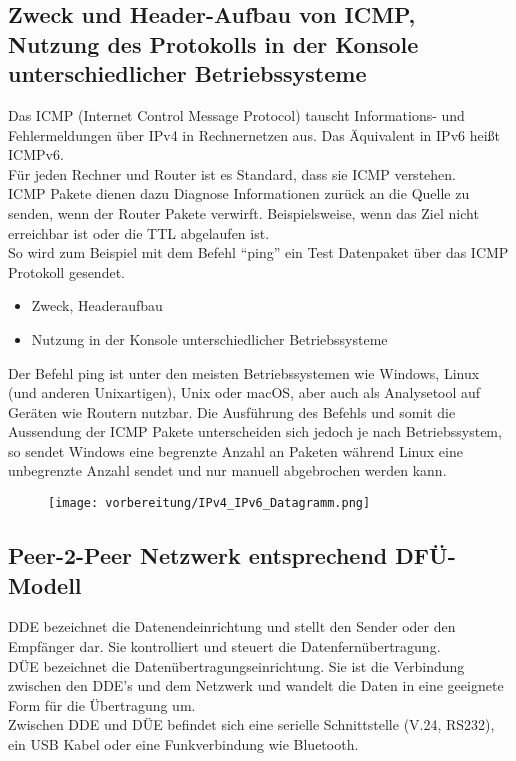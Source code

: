\subsection{Zweck und Header-Aufbau von ICMP, Nutzung des Protokolls in der Konsole unterschiedlicher Betriebssysteme}
    Das ICMP (Internet Control Message Protocol) tauscht Informations- und Fehlermeldungen über IPv4 in Rechnernetzen aus. Das Äquivalent in IPv6 heißt ICMPv6.\\
    Für jeden Rechner und Router ist es Standard, dass sie ICMP verstehen.\\
    ICMP Pakete dienen dazu Diagnose Informationen zurück an die Quelle zu senden, wenn der Router Pakete verwirft. Beispielsweise, wenn das Ziel nicht erreichbar ist oder die TTL abgelaufen ist.\\
    So wird zum Beispiel mit dem Befehl “ping” ein Test Datenpaket über das ICMP Protokoll gesendet.\\
    \begin{itemize}
        \item Zweck, Headeraufbau
        \item Nutzung in der Konsole unterschiedlicher Betriebssysteme
    \end{itemize}

    Der Befehl ping ist unter den meisten Betriebssystemen wie Windows, Linux (und anderen Unixartigen), Unix oder macOS, aber auch als Analysetool auf Geräten wie Routern nutzbar. Die Ausführung des Befehls und somit die Aussendung der ICMP Pakete unterscheiden sich jedoch je nach Betriebssystem, so sendet Windows eine begrenzte Anzahl an Paketen während Linux eine unbegrenzte Anzahl sendet und nur manuell abgebrochen werden kann.\\

    \begin{figure}[H]
        \centering
        \texttt{[image: vorbereitung/IPv4\_IPv6\_Datagramm.png]}
    \end{figure}




\subsection{Peer-2-Peer Netzwerk entsprechend DFÜ-Modell}

    DDE bezeichnet die Datenendeinrichtung und stellt den Sender oder den Empfänger dar. Sie kontrolliert und steuert die Datenfernübertragung.\\
    DÜE bezeichnet die Datenübertragungseinrichtung. Sie ist die Verbindung zwischen den DDE’s und dem Netzwerk und wandelt die Daten in eine geeignete Form für die Übertragung um.\\
    Zwischen DDE und DÜE befindet sich eine serielle Schnittstelle (V.24, RS232), ein USB Kabel oder eine Funkverbindung wie Bluetooth.\\

